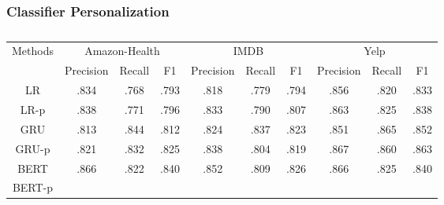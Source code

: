 \begin{table}[htp]
\centering
{}
\caption{}
\label{chap4:tab:usereval}
\end{table}


\subsubsection{Classifier Personalization}


\begin{table}[htp]
\centering
\begin{tabular}{c||ccc|ccc|ccc}
\multirow{2}{*}{Methods} & \multicolumn{3}{c|}{Amazon-Health} & \multicolumn{3}{c|}{IMDB} & \multicolumn{3}{c}{Yelp} \\
 & Precision & Recall & F1 & Precision & Recall & F1 & Precision & Recall & F1 \\\hline\hline
LR & .834 & .768 & .793 & .818 & .779 & .794 & .856 & .820 & .833 \\
LR-p & .838 & .771 & .796 & .833 & .790 & .807 & .863 & .825 & .838 \\\hline
GRU & .813 & .844 & .812 & .824 & .837 & .823 & .851 & .865 & .852 \\
GRU-p & .821 & .832 & .825 & .838 & .804 & .819 & .867 & .860 & .863 \\\hline
BERT & .866 & .822 & .840 & .852 & .809 & .826 & .866 & .825 & .840 \\
BERT-p &  &  &  &  &  &  &  &  & 
\end{tabular}
\caption{}
\label{chap4:tab:personalization}
\end{table}

